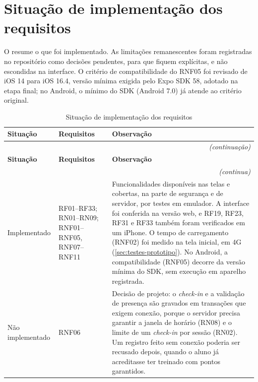 \section{Situação de implementação dos requisitos}
\label{sec:situacao-implementacao}

O  resume o que foi implementado. As
limitações remanescentes foram registradas no repositório como decisões
pendentes, para que fiquem explícitas, e não escondidas na interface. O
critério de compatibilidade do RNF05 foi revisado de iOS 14 para iOS
16.4, versão mínima exigida pelo Expo SDK 58, adotado na etapa final; no
Android, o mínimo do SDK (Android 7.0) já atende ao critério original.

\begin{quadrolongo}
\begin{longtable}{|p{2.2cm}|p{4.2cm}|p{7.0cm}|}
  \caption{Situação de implementação dos requisitos}\label{qua:implementacao}\\
  \hline
  \textbf{Situação} & \textbf{Requisitos} & \textbf{Observação} \\ \hline
\endfirsthead
  \multicolumn{3}{r}{\textit{(continuação)}}\\
  \hline
  \textbf{Situação} & \textbf{Requisitos} & \textbf{Observação} \\ \hline
\endhead
  \multicolumn{3}{r}{\textit{(continua)}}\\
\endfoot
\endlastfoot
    Implementado & RF01--RF33; RN01--RN09; RNF01--RNF05, RNF07--RNF11 & Funcionalidades disponíveis nas telas e cobertas, na parte de segurança e de servidor, por testes em emulador. A interface foi conferida na versão web, e RF19, RF23, RF31 e RF33 também foram verificados em um iPhone. O tempo de carregamento (RNF02) foi medido na tela inicial, em 4G (\autoref{sec:testes-prototipo}). No Android, a compatibilidade (RNF05) decorre da versão mínima do SDK, sem execução em aparelho registrada. \\ \hline
    Não implementado & RNF06 & Decisão de projeto: o \textit{check-in} e a validação de presença são gravados em transações que exigem conexão, porque o servidor precisa garantir a janela de horário (RN08) e o limite de um \textit{check-in} por sessão (RN02). Um registro feito sem conexão poderia ser recusado depois, quando o aluno já acreditasse ter treinado com pontos garantidos. \\ \hline
\end{longtable}
\end{quadrolongo}

